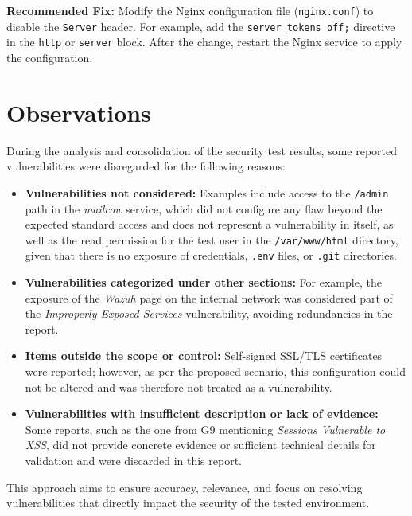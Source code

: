 \documentclass[a4paper,12pt]{article}
\begin{document}
\textbf{Recommended Fix:}  
Modify the Nginx configuration file (\texttt{nginx.conf}) to disable the \texttt{Server} header. For example, add the \texttt{server\_tokens off;} directive in the \texttt{http} or \texttt{server} block. After the change, restart the Nginx service to apply the configuration.

\vspace{1cm}

\clearpage

\section{Observations}

During the analysis and consolidation of the security test results, some reported vulnerabilities were disregarded for the following reasons:

\begin{itemize}
    \item \textbf{Vulnerabilities not considered:} Examples include access to the \texttt{/admin} path in the \textit{mailcow} service, which did not configure any flaw beyond the expected standard access and does not represent a vulnerability in itself, as well as the read permission for the test user in the \texttt{/var/www/html} directory, given that there is no exposure of credentials, \texttt{.env} files, or \texttt{.git} directories.

    \item \textbf{Vulnerabilities categorized under other sections:} For example, the exposure of the \textit{Wazuh} page on the internal network was considered part of the \textit{Improperly Exposed Services} vulnerability, avoiding redundancies in the report.

    \item \textbf{Items outside the scope or control:} Self-signed SSL/TLS certificates were reported; however, as per the proposed scenario, this configuration could not be altered and was therefore not treated as a vulnerability.

    \item \textbf{Vulnerabilities with insufficient description or lack of evidence:} Some reports, such as the one from G9 mentioning \textit{Sessions Vulnerable to XSS}, did not provide concrete evidence or sufficient technical details for validation and were discarded in this report.
\end{itemize}

This approach aims to ensure accuracy, relevance, and focus on resolving vulnerabilities that directly impact the security of the tested environment.
\end{document}
